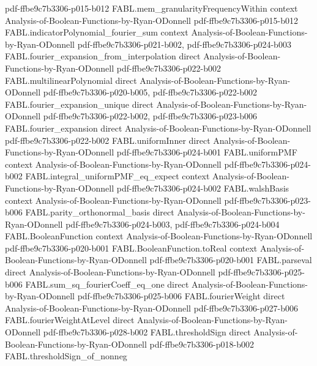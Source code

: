\begin{theorem}
  {pdf-ffbe9c7b3306-p015-b012}
\proofstep
  {FABL.mem_granularityFrequencyWithin}
  {context}
  {Analysis-of-Boolean-Functions-by-Ryan-ODonnell}
  {pdf-ffbe9c7b3306-p015-b012}
\proofstep
  {FABL.indicatorPolynomial_fourier_sum}
  {context}
  {Analysis-of-Boolean-Functions-by-Ryan-ODonnell}
  {pdf-ffbe9c7b3306-p021-b002,
    pdf-ffbe9c7b3306-p024-b003}
\proofstep
  {FABL.fourier_expansion_from_interpolation}
  {direct}
  {Analysis-of-Boolean-Functions-by-Ryan-ODonnell}
  {pdf-ffbe9c7b3306-p022-b002}
\proofstep
  {FABL.multilinearPolynomial}
  {direct}
  {Analysis-of-Boolean-Functions-by-Ryan-ODonnell}
  {pdf-ffbe9c7b3306-p020-b005,
    pdf-ffbe9c7b3306-p022-b002}
\proofstep
  {FABL.fourier_expansion_unique}
  {direct}
  {Analysis-of-Boolean-Functions-by-Ryan-ODonnell}
  {pdf-ffbe9c7b3306-p022-b002,
    pdf-ffbe9c7b3306-p023-b006}
\proofstep
  {FABL.fourier_expansion}
  {direct}
  {Analysis-of-Boolean-Functions-by-Ryan-ODonnell}
  {pdf-ffbe9c7b3306-p022-b002}
\proofstep
  {FABL.uniformInner}
  {direct}
  {Analysis-of-Boolean-Functions-by-Ryan-ODonnell}
  {pdf-ffbe9c7b3306-p024-b001}
\proofstep
  {FABL.uniformPMF}
  {context}
  {Analysis-of-Boolean-Functions-by-Ryan-ODonnell}
  {pdf-ffbe9c7b3306-p024-b002}
\proofstep
  {FABL.integral_uniformPMF_eq_expect}
  {context}
  {Analysis-of-Boolean-Functions-by-Ryan-ODonnell}
  {pdf-ffbe9c7b3306-p024-b002}
\proofstep
  {FABL.walshBasis}
  {context}
  {Analysis-of-Boolean-Functions-by-Ryan-ODonnell}
  {pdf-ffbe9c7b3306-p023-b006}
\proofstep
  {FABL.parity_orthonormal_basis}
  {direct}
  {Analysis-of-Boolean-Functions-by-Ryan-ODonnell}
  {pdf-ffbe9c7b3306-p024-b003,
    pdf-ffbe9c7b3306-p024-b004}
\proofstep
  {FABL.BooleanFunction}
  {context}
  {Analysis-of-Boolean-Functions-by-Ryan-ODonnell}
  {pdf-ffbe9c7b3306-p020-b001}
\proofstep
  {FABL.BooleanFunction.toReal}
  {context}
  {Analysis-of-Boolean-Functions-by-Ryan-ODonnell}
  {pdf-ffbe9c7b3306-p020-b001}
\proofstep
  {FABL.parseval}
  {direct}
  {Analysis-of-Boolean-Functions-by-Ryan-ODonnell}
  {pdf-ffbe9c7b3306-p025-b006}
\proofstep
  {FABL.sum_sq_fourierCoeff_eq_one}
  {direct}
  {Analysis-of-Boolean-Functions-by-Ryan-ODonnell}
  {pdf-ffbe9c7b3306-p025-b006}
\proofstep
  {FABL.fourierWeight}
  {direct}
  {Analysis-of-Boolean-Functions-by-Ryan-ODonnell}
  {pdf-ffbe9c7b3306-p027-b006}
\proofstep
  {FABL.fourierWeightAtLevel}
  {direct}
  {Analysis-of-Boolean-Functions-by-Ryan-ODonnell}
  {pdf-ffbe9c7b3306-p028-b002}
\proofstep
  {FABL.thresholdSign}
  {direct}
  {Analysis-of-Boolean-Functions-by-Ryan-ODonnell}
  {pdf-ffbe9c7b3306-p018-b002}
\proofstep
  {FABL.thresholdSign_of_nonneg}

\end{theorem}
